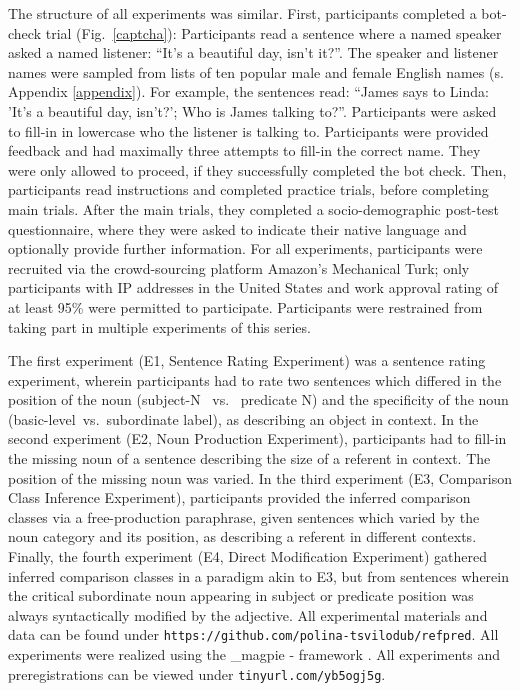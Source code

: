 The structure of all experiments was similar. First, participants completed a bot-check trial (Fig.~\ref{captcha}): Participants read a sentence where a named speaker asked a named listener: “It’s a beautiful day, isn’t it?”. The speaker and listener names were sampled from lists of ten popular male and female English names (s. Appendix \ref{appendix}). For example, the sentences read: “James says to Linda: 'It’s a beautiful day, isn’t?'; Who is James talking to?”.  Participants were asked to fill-in in lowercase who the listener is talking to. Participants were provided feedback and had maximally three attempts to fill-in the correct name. They were only allowed to proceed, if they successfully completed the bot check. Then, participants read instructions and completed practice trials, before completing main trials. After the main trials, they completed a socio-demographic post-test questionnaire, where they were asked to indicate their native language and optionally provide further information. 
For all experiments, participants were recruited via the crowd-sourcing platform Amazon’s Mechanical Turk; only participants with IP addresses in the United States and work approval rating of at least 95\% were permitted to participate. Participants were restrained from taking part in multiple experiments of this series.  

The first experiment (E1, Sentence Rating Experiment) was a sentence rating experiment, wherein participants had to rate two sentences which differed in the position of the noun (subject-N ~vs.~ predicate N) and the specificity of the noun (basic-level~vs.~subordinate label), as describing an object in context. 
In the second experiment (E2, Noun Production Experiment), participants had to fill-in the missing noun of a sentence describing the size of a referent in context. The position of the missing noun was varied. 
In the third experiment (E3, Comparison Class Inference Experiment), participants provided the inferred comparison classes via a free-production paraphrase, given sentences which varied by the noun category and its position, as describing a referent in different contexts. 
Finally, the fourth experiment (E4, Direct Modification Experiment) gathered inferred comparison classes in a paradigm akin to E3, but from sentences wherein the critical subordinate noun appearing in subject or predicate position was always syntactically modified by the adjective. 
All experimental materials and data can be found under \texttt{https://github.com/polina-tsvilodub/refpred}. All experiments were realized using the \_magpie - framework \parencite{magpie}. 
All experiments and preregistrations can be viewed under \texttt{tinyurl.com/yb5ogj5g}. 

